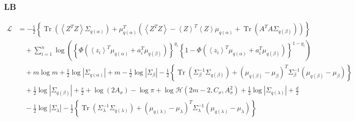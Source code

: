 \documentclass[11pt]{article}
\DeclareMathOperator{\Tr}{Tr}
\begin{document}
\subsubsection{LB}
\begin{align*}
  \mathcal{L} &= -\frac{1}{2}\left\{\Tr \left(\left\langle Z^{T}Z\right\rangle \Sigma_{q\left(\alpha\right)}\right) + \mu_{q\left(\alpha\right)}^{T}\left(\left\langle Z^{T}Z \right\rangle -\left\langle Z\right\rangle^{T}\left\langle Z\right\rangle \mu_{q\left(\alpha\right)} + \Tr\left(A^{T}A\Sigma_{q\left(\beta\right)}\right) \right) \right\}\\
  &\quad +\sum_{i=1}^{n}\log \left(\left\{\Phi\left(\left\langle z_{i} \right\rangle^{T}\mu_{q\left(\alpha\right)} + a_{i}^{T}\mu_{q\left(\beta\right)}\right) \right\}^{y_{i}}\left\{1-\Phi\left(\left\langle z_{i} \right\rangle^{T}\mu_{q\left(\alpha\right)} + a_{i}^{T}\mu_{q\left(\beta\right)}\right) \right\}^{1-y_{i}} \right)\\
  &\quad +m\log m +\frac{1}{2}\log \left|\Sigma_{q\left(\alpha\right)} \right| + m -\frac{1}{2}\log \left|\Sigma_{\beta}\right| -\frac{1}{2}\left\{\Tr \left(\Sigma_{\beta}^{-1}\Sigma_{q\left(\beta\right)}\right) + \left(\mu_{q\left(\beta\right)}-\mu_{\beta} \right)^{T}\Sigma_{\beta}^{-1}\left(\mu_{q\left(\beta\right)}-\mu_{\beta} \right) \right\} \\
  &\quad + \frac{1}{2}\log \left|\Sigma_{q\left(\beta\right)}\right| + \frac{s}{2} + \log \left(2A_{\sigma}\right) -\log \pi +\log \mathcal{H}\left(2m-2, C_{\sigma}, A_{\sigma}^{2}\right) +\frac{1}{2}\log \left|\Sigma_{q\left(\lambda\right)}\right| +\frac{d}{2}\\
  &\quad -\frac{1}{2}\log \left|\Sigma_{\lambda}\right| -\frac{1}{2}\left\{\Tr\left(\Sigma_{\lambda}^{-1}\Sigma_{q\left(\lambda\right)} \right)+\left(\mu_{q\left(\lambda\right)}-\mu_{\lambda}\right)^{T}\Sigma_{\lambda}^{-1}\left(\mu_{q\left(\lambda\right)}-\mu_{\lambda}\right) \right\}
\end{align*}
\end{document}
